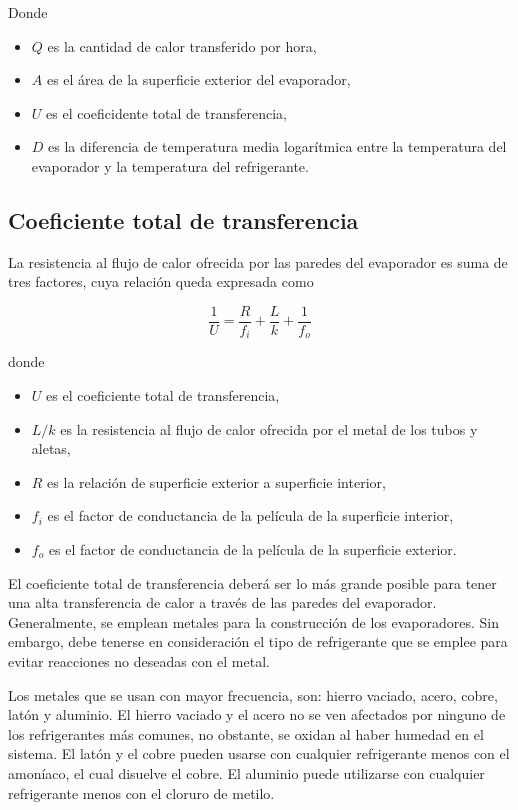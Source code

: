 		Donde \begin{itemize}
			\item $Q$ es la cantidad de calor transferido por hora,
			\item $A$ es el área de la superficie exterior del evaporador,
			\item $U$ es el coeficidente total de transferencia,
			\item $D$ es la diferencia de temperatura media logarítmica entre la temperatura del evaporador y la temperatura del refrigerante.
		\end{itemize}
	
	
			\subsection{Coeficiente total de transferencia}
				
				La resistencia al flujo de calor ofrecida por las paredes del evaporador es suma de tres factores, cuya relación queda expresada como
				
				\begin{equation}\label{eq:conductancia-total}
					\dfrac{1}{U} = \dfrac{R}{f_i} + \dfrac{L}{k} + \dfrac{1}{f_o}
				\end{equation}
				
				donde \begin{itemize}
					\item $U$ es el coeficiente total de transferencia,
					\item $L/k$ es la resistencia al flujo de calor ofrecida por el metal de los tubos y aletas,
					\item $R$ es la relación de superficie exterior a superficie interior,
					\item $f_i$ es el factor de conductancia de la película de la superficie interior,
					\item $f_o$ es el factor de conductancia de la película de la superficie exterior.
				\end{itemize}
				
				El coeficiente total de transferencia deberá ser lo más grande posible para tener una alta transferencia de calor a través de las paredes del evaporador. Generalmente, se emplean metales para la construcción de los evaporadores. Sin embargo, debe tenerse en consideración el tipo de refrigerante que se emplee para evitar reacciones no deseadas con el metal. 
		
				
				Los metales que se usan con mayor frecuencia, son: hierro vaciado, acero, cobre, latón y aluminio. El hierro vaciado y el acero no se ven afectados por ninguno de los refrigerantes más comunes, no obstante, se oxidan al haber humedad en el sistema. El latón y el cobre pueden usarse con cualquier refrigerante menos con el amoníaco, el cual disuelve el cobre. El aluminio puede utilizarse con cualquier refrigerante menos con el cloruro de metilo.\\
				
